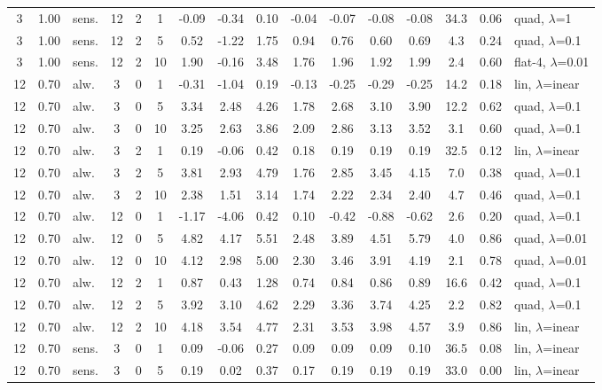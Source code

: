 \documentclass[10pt]{article}
\begin{document}
\begin{scriptsize}
\begin{longtable}{cclcc c ccc ccc c cc l}
3 & 1.00 & sens. & 12 & 2 & 1 & -0.09 & -0.34 & 0.10 & -0.04 & -0.07 & -0.08 & -0.08 & 34.3 & 0.06 & quad, $\lambda$=1 \\
3 & 1.00 & sens. & 12 & 2 & 5 & 0.52 & -1.22 & 1.75 & 0.94 & 0.76 & 0.60 & 0.69 & 4.3 & 0.24 & quad, $\lambda$=0.1 \\
3 & 1.00 & sens. & 12 & 2 & 10 & 1.90 & -0.16 & 3.48 & 1.76 & 1.96 & 1.92 & 1.99 & 2.4 & 0.60 & flat-4, $\lambda$=0.01 \\
12 & 0.70 & alw. & 3 & 0 & 1 & -0.31 & -1.04 & 0.19 & -0.13 & -0.25 & -0.29 & -0.25 & 14.2 & 0.18 & lin, $\lambda$=inear \\
12 & 0.70 & alw. & 3 & 0 & 5 & 3.34 & 2.48 & 4.26 & 1.78 & 2.68 & 3.10 & 3.90 & 12.2 & 0.62 & quad, $\lambda$=0.1 \\
12 & 0.70 & alw. & 3 & 0 & 10 & 3.25 & 2.63 & 3.86 & 2.09 & 2.86 & 3.13 & 3.52 & 3.1 & 0.60 & quad, $\lambda$=0.1 \\
12 & 0.70 & alw. & 3 & 2 & 1 & 0.19 & -0.06 & 0.42 & 0.18 & 0.19 & 0.19 & 0.19 & 32.5 & 0.12 & lin, $\lambda$=inear \\
12 & 0.70 & alw. & 3 & 2 & 5 & 3.81 & 2.93 & 4.79 & 1.76 & 2.85 & 3.45 & 4.15 & 7.0 & 0.38 & quad, $\lambda$=0.1 \\
12 & 0.70 & alw. & 3 & 2 & 10 & 2.38 & 1.51 & 3.14 & 1.74 & 2.22 & 2.34 & 2.40 & 4.7 & 0.46 & quad, $\lambda$=0.1 \\
12 & 0.70 & alw. & 12 & 0 & 1 & -1.17 & -4.06 & 0.42 & 0.10 & -0.42 & -0.88 & -0.62 & 2.6 & 0.20 & quad, $\lambda$=0.1 \\
12 & 0.70 & alw. & 12 & 0 & 5 & 4.82 & 4.17 & 5.51 & 2.48 & 3.89 & 4.51 & 5.79 & 4.0 & 0.86 & quad, $\lambda$=0.01 \\
12 & 0.70 & alw. & 12 & 0 & 10 & 4.12 & 2.98 & 5.00 & 2.30 & 3.46 & 3.91 & 4.19 & 2.1 & 0.78 & quad, $\lambda$=0.01 \\
12 & 0.70 & alw. & 12 & 2 & 1 & 0.87 & 0.43 & 1.28 & 0.74 & 0.84 & 0.86 & 0.89 & 16.6 & 0.42 & quad, $\lambda$=0.1 \\
12 & 0.70 & alw. & 12 & 2 & 5 & 3.92 & 3.10 & 4.62 & 2.29 & 3.36 & 3.74 & 4.25 & 2.2 & 0.82 & quad, $\lambda$=0.1 \\
12 & 0.70 & alw. & 12 & 2 & 10 & 4.18 & 3.54 & 4.77 & 2.31 & 3.53 & 3.98 & 4.57 & 3.9 & 0.86 & lin, $\lambda$=inear \\
12 & 0.70 & sens. & 3 & 0 & 1 & 0.09 & -0.06 & 0.27 & 0.09 & 0.09 & 0.09 & 0.10 & 36.5 & 0.08 & lin, $\lambda$=inear \\
12 & 0.70 & sens. & 3 & 0 & 5 & 0.19 & 0.02 & 0.37 & 0.17 & 0.19 & 0.19 & 0.19 & 33.0 & 0.00 & lin, $\lambda$=inear \\

\end{longtable}
\end{scriptsize}
\end{document}
